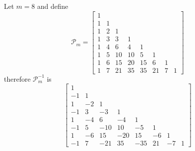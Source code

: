 Let $m=8$ and define
\begin{displaymath}
\mathcal{P}_{m}=\left[\begin{matrix}1 &   &   &   &   &   &   &  \\1 & 1 &   &   &   &   &   &  \\1 & 2 & 1 &   &   &   &   &  \\1 & 3 & 3 & 1 &   &   &   &  \\1 & 4 & 6 & 4 & 1 &   &   &  \\1 & 5 & 10 & 10 & 5 & 1 &   &  \\1 & 6 & 15 & 20 & 15 & 6 & 1 &  \\1 & 7 & 21 & 35 & 35 & 21 & 7 & 1\end{matrix}\right]
\end{displaymath}
therefore $\mathcal{P}_{m}^{-1}$ is
\begin{displaymath}
\left[\begin{matrix}1 &   &   &   &   &   &   &  \\-1 & 1 &   &   &   &   &   &  \\1 & -2 & 1 &   &   &   &   &  \\-1 & 3 & -3 & 1 &   &   &   &  \\1 & -4 & 6 & -4 & 1 &   &   &  \\-1 & 5 & -10 & 10 & -5 & 1 &   &  \\1 & -6 & 15 & -20 & 15 & -6 & 1 &  \\-1 & 7 & -21 & 35 & -35 & 21 & -7 & 1\end{matrix}\right]
\end{displaymath}
